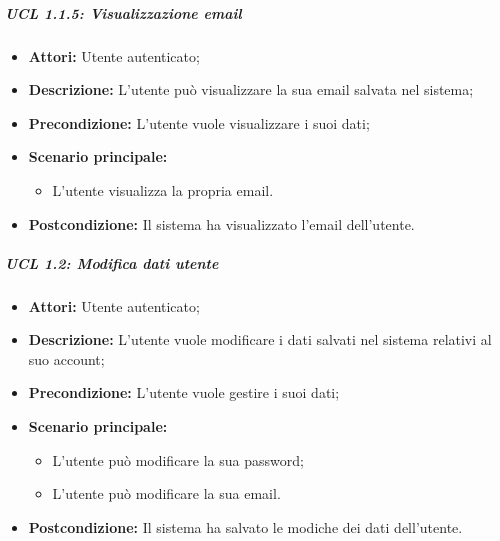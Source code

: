 \subparagraph{UCL 1.1.5: Visualizzazione email}
\begin{itemize}
	\item \textbf{Attori:} Utente autenticato;
	\item \textbf{Descrizione:} L'utente può visualizzare la sua email salvata nel sistema;
	\item \textbf{Precondizione:} L'utente vuole visualizzare i suoi dati;
	\item \textbf{Scenario principale:}
	\begin{itemize}
	 \item L'utente visualizza la propria email.
	\end{itemize}
	\item \textbf{Postcondizione:} Il sistema ha visualizzato l'email dell'utente.
\end{itemize}

 
\subparagraph{UCL 1.2: Modifica dati utente} %
\begin{itemize}
	\item \textbf{Attori:} Utente autenticato;
	\item \textbf{Descrizione:} L'utente vuole modificare i dati salvati nel sistema relativi al suo account;
	\item \textbf{Precondizione:} L'utente vuole gestire i suoi dati;
	\item \textbf{Scenario principale:}
	\begin{itemize}
		\item L'utente può modificare la sua password;
		\item L'utente può modificare la sua email.
	\end{itemize}
\item \textbf{Postcondizione:} Il sistema ha salvato le modiche dei dati dell'utente.
\end{itemize}

